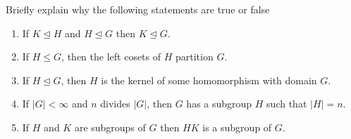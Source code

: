 \documentclass[12 pt, letterpaper]{hmcpset}
\begin{document}
\begin{problem}[5.]
	Briefly explain why the following statements are true or false
	\begin{enumerate}
		\item If $K \trianglelefteq H$ and $H \trianglelefteq G$ then $K \trianglelefteq G$.
		\item If $H \le G$, then the left cosets of $H$ partition $G$.
		\item If $H \trianglelefteq G$, then $H$ is the kernel of some homomorphism with domain $G$.
		\item If $\lvert G \rvert < \infty$ and $n$ divides $\lvert G \rvert$, then $G$ has a subgroup $H$ such that $\lvert H \rvert = n$.
		\item If $H$ and $K$ are subgroups of $G$ then $HK$ is a subgroup of $G$.
	\end{enumerate}
\end{problem}
\end{document}
